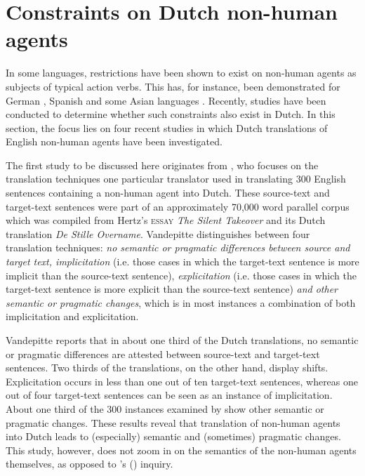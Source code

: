 \documentclass[output=paper]{LSP/langsci}
\begin{document}
\section{Constraints on Dutch non-human agents} \label{sec:5:3}
In some languages, restrictions have been shown to exist on non-human agents as subjects of typical action verbs. This has, for instance, been demonstrated for German \citep[see e.g.][]{Bahns1993}, Spanish \citep[see e.g.][]{Slabakova2002} and some Asian languages \citep[see e.g.][]{Master1991}. Recently, studies have been conducted to determine whether such constraints also exist in Dutch. In this section, the focus lies on four recent studies in which Dutch translations of English non-human agents have been investigated.

The first study to be discussed here originates from  \citet{Vandepitte2007}, who focuses on the translation techniques one particular translator used in translating 300 English sentences containing a non-human agent into Dutch. These source-text and target-text sentences were part of an approximately 70,000 word parallel corpus which was compiled from Hertz’s \textsc{essay} \textit{The Silent Takeover} and its Dutch translation \textit{De Stille Overname}. Vandepitte distinguishes between four translation techniques: \textit{no semantic or pragmatic differences between source and target text, implicitation} (i.e. those cases in which the target-text sentence is more implicit than the source-text sentence), \textit{explicitation} (i.e. those cases in which the target-text sentence is more explicit than the source-text sentence) \textit{and other semantic or pragmatic changes}, which is in most instances a combination of both implicitation and explicitation.

Vandepitte reports that in about one third of the Dutch translations, no semantic or pragmatic differences are attested between source-text and target-text sentences. Two thirds of the translations, on the other hand, display shifts. Explicitation occurs in less than one out of ten target-text sentences, whereas one out of four target-text sentences can be seen as an instance of implicitation. About one third of the 300 instances examined by \citet{Vandepitte2007} show other semantic or pragmatic changes. These results reveal that translation of non-human agents into Dutch leads to (especially) semantic and (sometimes) pragmatic changes. This study, however, does not zoom in on the semantics of the non-human agents themselves, as opposed to \citeauthor{Dhaeyere2010}'s (\citeyear{Dhaeyere2010}) inquiry. 
	
\end{document}
